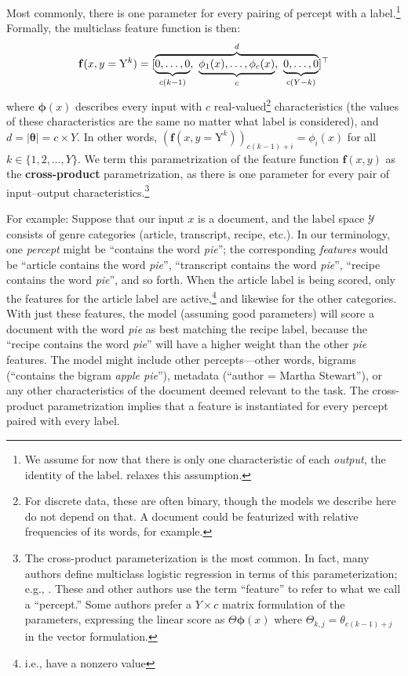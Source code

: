 \documentclass[11pt,letterpaper]{article}
\newcommand{\ensuretext}[1]{#1}
\newcommand{\nssmarker}{\ensuretext{\textcolor{magenta}{\ensuremath{^{\textsc{NS}}_{\textsc{S}}}}}}
\newcommand{\arkcomment}[3]{\ensuretext{\textcolor{#3}{[#1 #2]}}}
\newcommand{\nss}[1]{\arkcomment{\nssmarker}{#1}{magenta}}
\begin{document}
Most commonly, there is one parameter for every pairing of percept with a label.\footnote{We assume 
for now that there is only one characteristic of each {\em output}, the identity of the label.  relaxes this assumption.}
Formally, the multiclass feature function is then:
\begin{equation}\label{eq:crossprod}
\mathbf{f}(x,y=\mathrm{Y}^k) = [\overbrace{\underbrace{0, \ldots, 0\vphantom{\phi}}_{c(k-1)},\ \underbrace{\phi_1(x), \ldots, \phi_c(x)}_{c\vphantom{(}},\ \underbrace{0, \ldots, 0\vphantom{\phi}}_{c(Y-k)}}^d]^{\top}
\end{equation}
where $\boldsymbol{\phi}(x)$ describes every input with $c$ real-valued\footnote{For discrete data, these are often binary, though the models we describe here do not depend on that. A document could be featurized with relative frequencies of its words, for example.} 
characteristics (the values of these characteristics are the same no matter what label is considered), 
and $d = |\boldsymbol{\theta}| = c \times Y$.
In other words, $\left(\mathbf{f}(x,y=\mathrm{Y}^k)\right)_{c(k-1)+i} = \phi_i(x)$ for all $k\in\{1,2,\ldots,Y\}$.
We term this parametrization of the feature function $\mathbf{f}(x,y)$ as the {\bf cross-product}
parametrization, as there is one parameter for every pair of input--output characteristics.\footnote{The cross-product parameterization is the most common. 
In fact, many authors define multiclass logistic regression in terms of this parameterization; e.g., \citet{hastie-09}. 
These and other authors use the term ``feature'' to refer to what we call a ``percept.''
Some authors prefer a $Y \times c$ matrix formulation of the parameters, expressing the linear score as $\Theta \boldsymbol{\phi}(x)$ 
where $\Theta_{k,j}=\theta_{c(k-1)+j}$ in the vector formulation.}

For example: Suppose that our input $x$ is a document, and the label space $\mathcal{Y}$ consists of genre categories ({\sc article}, {\sc transcript}, {\sc recipe}, etc.).
In our terminology, one {\em percept} might be ``contains the word \textit{pie}''; the corresponding {\em features} 
would be ``{\sc article} contains the word \textit{pie}'', ``{\sc transcript} contains the word \textit{pie}'', ``{\sc recipe} contains the word \textit{pie}'', 
and so forth. When the {\sc article} label is being scored, only the features for the {\sc article} label are active,\footnote{i.e., have a nonzero value} 
and likewise for the other categories. With just these features, the model (assuming good parameters) will score 
a document with the word \textit{pie} as best matching the {\sc recipe} label, because the 
``{\sc recipe} contains the word \textit{pie}'' will have a higher weight than the other \textit{pie} features.
The model might include other percepts---other words, bigrams (``contains the bigram \textit{apple pie}''), 
metadata (``author = Martha Stewart''), or any other characteristics of the document deemed relevant to the task.
The cross-product parametrization implies that a feature is instantiated for every percept paired with every label.
\end{document}
